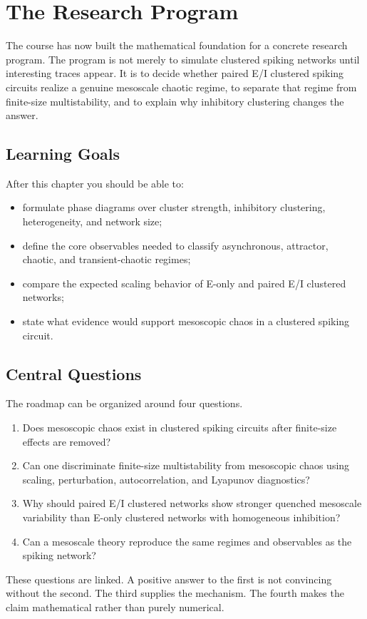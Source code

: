 \chapter{The Research Program}
\label{ch:research-program}

The course has now built the mathematical foundation for a concrete research
program. The program is not merely to simulate clustered spiking networks until
interesting traces appear. It is to decide whether paired E/I clustered spiking
circuits realize a genuine mesoscale chaotic regime, to separate that regime
from finite-size multistability, and to explain why inhibitory clustering
changes the answer.

\section*{Learning Goals}

After this chapter you should be able to:
\begin{itemize}
    \item formulate phase diagrams over cluster strength, inhibitory clustering,
    heterogeneity, and network size;
    \item define the core observables needed to classify asynchronous,
    attractor, chaotic, and transient-chaotic regimes;
    \item compare the expected scaling behavior of E-only and paired E/I
    clustered networks;
    \item state what evidence would support mesoscopic chaos in a clustered
    spiking circuit.
\end{itemize}

\section{Central Questions}
\label{sec:ch10-central-questions}

The roadmap can be organized around four questions.
\begin{enumerate}
    \item Does mesoscopic chaos exist in clustered spiking circuits after
    finite-size effects are removed?
    \item Can one discriminate finite-size multistability from mesoscopic chaos
    using scaling, perturbation, autocorrelation, and Lyapunov diagnostics?
    \item Why should paired E/I clustered networks show stronger quenched
    mesoscale variability than E-only clustered networks with homogeneous
    inhibition?
    \item Can a mesoscale theory reproduce the same regimes and observables as
    the spiking network?
\end{enumerate}
These questions are linked. A positive answer to the first is not convincing
without the second. The third supplies the mechanism. The fourth makes the
claim mathematical rather than purely numerical.

